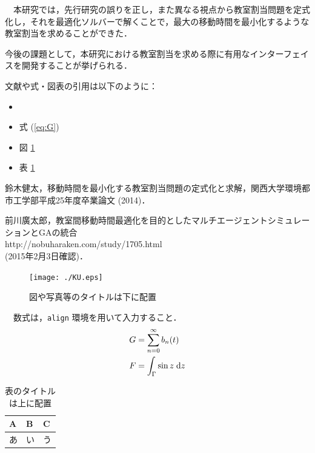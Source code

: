 \documentclass[a4paper,10pt]{jarticle}
\begin{document}
　本研究では，先行研究の誤りを正し，また異なる視点から教室割当問題を定式化し，それを最適化ソルバーで解くことで，最大の移動時間を最小化するような教室割当を求めることができた．

今後の課題として，本研究における教室割当を求める際に有用なインターフェイスを開発することが挙げられる．

文献や式・図表の引用は以下のように：
\begin{itemize}
 \item \cite{都市12}
 \item 式 (\ref{eq:G})
 \item 図 \ref{fig:1}
 \item 表 \ref{tb:1}
\end{itemize}
\fi
\vspace{-2.5mm}
\begin{thebibliography}{9}
\vspace{-2.5mm}
%

\vspace{-1.5mm}

鈴木健太，移動時間を最小化する教室割当問題の定式化と求解，関西大学環境都市工学部平成25年度卒業論文 (2014)．
\vspace{-2.5mm}

前川廣太郎，教室間移動時間最適化を目的としたマルチエージェントシミュレーションとGAの統合\\
http://nobuharaken.com/study/1705.html\\(2015年2月3日確認)．

\end{thebibliography}
\begin{figure}[htpb]
 \begin{center}
  \texttt{[image: ./KU.eps]}
  \caption{図や写真等のタイトルは下に配置}
  \label{fig:1}
 \end{center}
\end{figure}
　数式は，\verb|align| 環境を用いて入力すること．
%
\begin{align}
 G &= \sum_{n = 0}^\infty b_n(t)
 \label{eq:G} \\
 F &= \int_\Gamma \sin z \; {\rm d}z
 \label{eq:F}
\end{align}
%
\begin{table}
 \begin{center}
  \caption{表のタイトルは上に配置}
  \begin{tabular}{|l|l|l|}
   \hline
   A \hspace{2cm} & B \hspace{2cm} & C \hspace{2cm} \\
   \hline
   あ & い & う \\
   \hline
  \end{tabular}
  \label{tb:1}
 \end{center}
\end{table}
\fi
\end{document}
